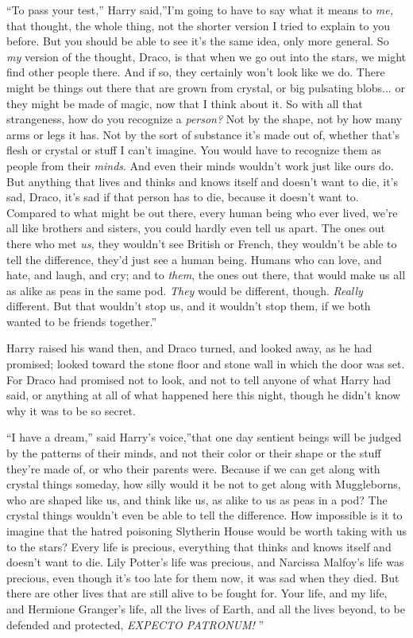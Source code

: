 ``To pass your test,'' Harry said,''I'm going to have to say what it
means to \emph{me,} that thought, the whole thing, not the shorter
version I tried to explain to you before. But you should be able to see
it's the same idea, only more general. So \emph{my} version of the
thought, Draco, is that when we go out into the stars, we might find
other people there. And if so, they certainly won't look like we do.
There might be things out there that are grown from crystal, or big
pulsating blobs... or they might be made of magic, now that I think
about it. So with all that strangeness, how do you recognize a
\emph{person?} Not by the shape, not by how many arms or legs it has.
Not by the sort of substance it's made out of, whether that's flesh or
crystal or stuff I can't imagine. You would have to recognize them as
people from their \emph{minds}. And even their minds wouldn't work just
like ours do. But anything that lives and thinks and knows itself and
doesn't want to die, it's sad, Draco, it's sad if that person has to
die, because it doesn't want to. Compared to what might be out there,
every human being who ever lived, we're all like brothers and sisters,
you could hardly even tell us apart. The ones out there who met
\emph{us,} they wouldn't see British or French, they wouldn't be able to
tell the difference, they'd just see a human being. Humans who can love,
and hate, and laugh, and cry; and to \emph{them}, the ones out there,
that would make us all as alike as peas in the same pod. \emph{They}
would be different, though. \emph{Really} different. But that wouldn't
stop us, and it wouldn't stop them, if we both wanted to be friends
together.''

Harry raised his wand then, and Draco turned, and looked away, as he had
promised; looked toward the stone floor and stone wall in which the door
was set. For Draco had promised not to look, and not to tell anyone of
what Harry had said, or anything at all of what happened here this
night, though he didn't know why it was to be so secret.

``I have a dream,'' said Harry's voice,''that one day sentient beings
will be judged by the patterns of their minds, and not their color or
their shape or the stuff they're made of, or who their parents were.
Because if we can get along with crystal things someday, how silly would
it be not to get along with Muggleborns, who are shaped like us, and
think like us, as alike to us as peas in a pod? The crystal things
wouldn't even be able to tell the difference. How impossible is it to
imagine that the hatred poisoning Slytherin House would be worth taking
with us to the stars? Every life is precious, everything that thinks and
knows itself and doesn't want to die. Lily Potter's life was precious,
and Narcissa Malfoy's life was precious, even though it's too late for
them now, it was sad when they died. But there are other lives that are
still alive to be fought for. Your life, and my life, and Hermione
Granger's life, all the lives of Earth, and all the lives beyond, to be
defended and protected, \emph{EXPECTO PATRONUM!} ''

